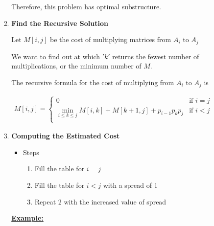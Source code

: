 \documentclass[12pt]{article}
\begin{document}
\begin{enumerate}[1.]
\begin{itemize}
\begin{itemize}
\begin{enumerate}[1.]
                \bigskip

                Therefore, this problem has optimal substructure.

                \bigskip


                \item \textbf{Find the Recursive Solution}

                \bigskip

                Let $M[i,j]$ be the cost of multiplying matrices from $A_i$ to $A_j$

                \bigskip

                We want to find out at which $'k'$ returns the fewest number of multiplications,
                or the minimum number of $M$.

                \bigskip

                The recursive formula for the cost of multiplying from $A_i$ to $A_j$ is

                \begin{align}
                    M[i,j] = \begin{cases}
                        0 & \text{if $i = j$}\\
                        \min_{i \leq k \leq j} M[i,k] + M[k+1,j] + p_{i-1}p_{k}p_j & \text{if $i < j$}\\
                    \end{cases}
                \end{align}

                \item \textbf{Computing the Estimated Cost}
                \begin{itemize}
                    \item Steps
                    \begin{enumerate}[1)]
                        \item Fill the table for $i = j$
                        \item Fill the table for $i < j$ with a spread of 1
                        \item Repeat 2 with the increased value of spread
                    \end{enumerate}
                \end{itemize}

                \bigskip

                \underline{\textbf{Example:}}

                \bigskip


\end{enumerate}
\end{itemize}
\end{itemize}
\end{enumerate}
\end{document}
